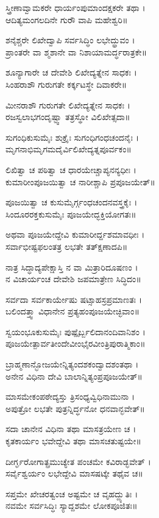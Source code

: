 ಸ್ತ್ರೀಣಾವ್ವಾಮಕರೇ ಧಾರ್ಯಂಪುಮಾಂದಕ್ಷಕರೇ ತಥಾ ।\\
ಆದಿತ್ಯಮಂಗಲದಿನೇ ಗುರೌ ವಾಪಿ ಮಹೇಶ್ವರಿ॥

ಶನೈಶ್ಚರೇ ಲಿಖೇದ್ವಾಪಿ ಸರ್ವಸಿದ್ಧಿಂ ಲಭೇದ್ಧ್ರುವಂ ।\\
ಪ್ರಾಂತರೇ ವಾ ಶ್ಮಶಾನೇ ವಾ ನಿಶಾಯಾಮರ್ದ್ಧರಾತ್ರಕೇ॥

ಶೂನ್ಯಾಗಾರೇ ಚ ದೇವೇಶಿ ಲಿಖೇದ್ಯತ್ನೇನ ಸಾಧಕಃ ।\\
ಸಿಂಹರಾಶೌ ಗುರುಗತೇ ಕರ್ಕ್ಕಟಸ್ಥೇ ದಿವಾಕರೇ॥

ಮೀನರಾಶೌ ಗುರುಗತೇ ಲಿಖೇದ್ಯತ್ನೇನ ಸಾಧಕಃ ।\\
ರಜಸ್ವಲಾಭಗಂದೃಷ್ಟ್ವಾ ತತ್ರಸ್ಥೋ ವಿಲಿಖೇತ್ಸದಾ॥

ಸುಗಂಧಿಕುಸುಮೈಃ ಶುಕ್ರೈಃ ಸುಗಂಧಿಗಂಧಚಂದನೈಃ ।\\
ಮೃಗನಾಭಿಮೃಗಮದೈರ್ವಿಲಿಖೇದ್ಯತ್ನಪೂರ್ವಕಂ॥

ಲಿಖಿತ್ವಾ ಚ ಪಠಿತ್ವಾ ಚ ಧಾರಯೇಚ್ಚಾಪ್ಯನನ್ಯಧೀಃ ।\\
ಕುಮಾರೀಂಪೂಜಯಿತ್ವಾ ಚ ನಾರೀಶ್ಚಾಪಿ ಪ್ರಪೂಜಯೇತ್॥

ಪೂಜಯಿತ್ವಾ ಚ ಕುಸುಮೈರ್ಗ್ಗಂಧಚಂದನವಸ್ತ್ರಕೈಃ ।\\
ಸಿಂದೂರರಕ್ತಕುಸುಮೈಃ ಪೂಜಯೇದ್ಭಕ್ತಿಯೋಗತಃ॥

ಅಥವಾ ಪೂಜಯೇದ್ದೇವಿ ಕುಮಾರೀರ್ದ್ದಶಮಾವಧೀಃ ।\\
ಸರ್ವಾಭೀಷ್ಟಫಲಂತತ್ರ ಲಭತೇ ತತ್ಕ್ಷಣಾದಪಿ॥

ನಾತ್ರ ಸಿದ್ಧಾದ್ಯಪೇಕ್ಷಾಸ್ತಿ ನ ವಾ ಮಿತ್ರಾರಿದೂಷಣಂ ।\\
ನ ವಿಚಾರ್ಯಂಚ ದೇವೇಶಿ ಜಪಮಾತ್ರೇಣ ಸಿದ್ಧಿದಂ॥

ಸರ್ವದಾ ಸರ್ವಕಾರ್ಯೇಷು ಷಟ್ಸಾಹಸ್ರಪ್ರಮಾಣತಃ ।\\
ಬಲಿಂದತ್ತ್ವಾ ವಿಧಾನೇನ ಪ್ರತ್ಯಹಂಪೂಜಯೇಚ್ಛಿವಾಂ॥

ಸ್ವಯಂಭೂಕುಸುಮೈಃ ಪುಷ್ಪೈರ್ಬ್ಬಲಿದಾನಂದಿವಾನಿಶಂ ।\\
ಪೂಜಯೇತ್ಪಾರ್ವತೀಂದೇವೀಂಭೈರವೀಂತ್ರಿಪುರಾತ್ಮಿಕಾಂ॥

ಬ್ರಾಹ್ಮಣಾನ್ಭೋಜಯೇನ್ನಿತ್ಯಂದಶಕಂದ್ವಾದಶಂತಥಾ ।\\
ಅನೇನ ವಿಧಿನಾ ದೇವಿ ಬಾಲಾನ್ನಿತ್ಯಂಪ್ರಪೂಜಯೇತ್॥

ಮಾಸಮೇಕಂಪಠೇದ್ಯಸ್ತು ತ್ರಿಸಂಧ್ಯವ್ವಿಧಿನಾಮುನಾ ।\\
ಅಪುತ್ರೋ ಲಭತೇ ಪುತ್ರನ್ನಿರ್ದ್ಧನೋ ಧನವಾನ್ಭವೇತ್॥

ಸದಾ ಚಾನೇನ ವಿಧಿನಾ ತಥಾ ಮಾಸತ್ರಯೇಣ ಚ ।\\
ಕೃತಕಾರ್ಯಂ ಭವೇದ್ದೇವಿ ತಥಾ ಮಾಸಚತುಷ್ಟಯೇ॥

ದೀರ್ಗ್ಘರೋಗಾತ್ಪ್ರಮುಚ್ಯೇತ ಪಂಚಮೇ ಕವಿರಾಡ್ಭವೇತ್ ।\\
ಸರ್ವೈಶ್ವರ್ಯಂ ಲಭೇದ್ದೇವಿ ಮಾಸಷಟ್ಕೇ ತಥೈವ ಚ॥

ಸಪ್ತಮೇ ಖೇಚರತ್ವಂಚ ಅಷ್ಟಮೇ ಚ ವೃಹದ್ದ್ಯುತಿಃ ।\\
ನವಮೇ ಸರ್ವಸಿದ್ಧಿಃ ಸ್ಯಾದ್ದಶಮೇ ಲೋಕಪೂಜಿತಃ॥

